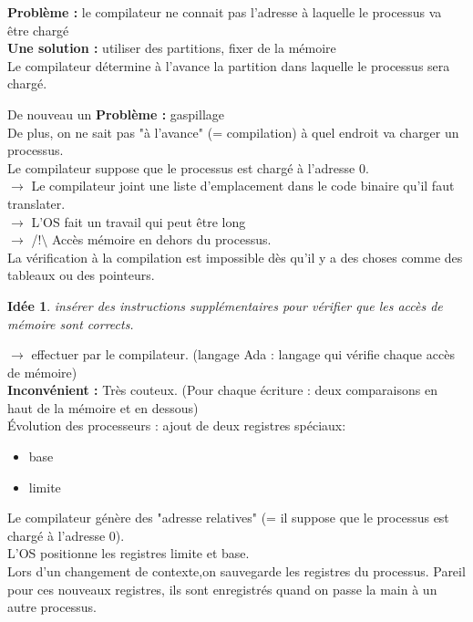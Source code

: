 \documentclass[12pt,a4paper]{report}
\newtheorem*{id}{Idée}
\begin{document}
\textbf{Problème :} le compilateur ne connait pas l'adresse à laquelle le processus va être chargé\\

\textbf{Une solution :} utiliser des partitions, fixer de la mémoire\\
Le compilateur détermine à l'avance la partition dans laquelle le processus sera chargé.

De nouveau un
\textbf{Problème :} gaspillage\\
De plus, on ne sait pas "à l'avance" (= compilation) à quel endroit va charger un processus.\\

Le compilateur suppose que le processus est chargé à l'adresse 0.\\
$\rightarrow$ Le compilateur joint une liste d'emplacement dans le code binaire qu'il faut translater.\\
$\rightarrow$ L'OS fait un travail qui peut être long\\
$\rightarrow$ /!$\setminus$ Accès mémoire en dehors du processus.\\
La vérification à la compilation est impossible dès qu'il y a des choses comme des tableaux ou des pointeurs.\\

\begin{id}insérer des instructions supplémentaires pour vérifier que les accès de mémoire sont corrects.\end{id}
$\rightarrow$ effectuer par le compilateur. (langage Ada : langage qui vérifie chaque accès de mémoire)\\
\textbf{Inconvénient :} Très couteux. (Pour chaque écriture : deux comparaisons en haut de la mémoire et en dessous)\\

Évolution des processeurs :
ajout de deux registres spéciaux:
\begin{itemize}
\item base
\item limite
\end{itemize} 
Le compilateur génère des "adresse relatives" (= il suppose que le processus est chargé à l'adresse 0).\\
L'OS positionne les registres limite et base.\\

Lors d'un changement de contexte,on sauvegarde les registres du processus. Pareil pour ces nouveaux registres, ils sont enregistrés quand on passe la main à un autre processus.
\end{document}
